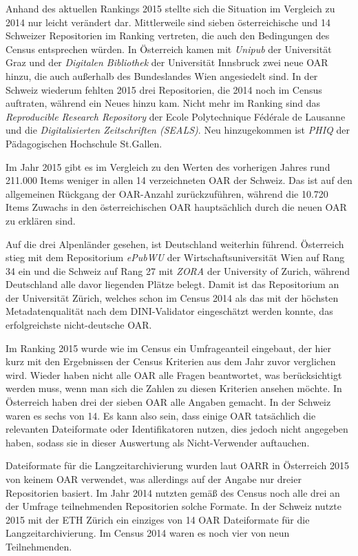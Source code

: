 \documentclass[a4paper,
fontsize=11pt,
oneside,
numbers=noperiodatend,
parskip=half-,
bibliography=totoc,
final
]{scrartcl}
\begin{document}
Anhand des aktuellen Rankings 2015 stellte sich die Situation im
Vergleich zu 2014 nur leicht verändert dar. Mittlerweile sind sieben
österreichische und 14 Schweizer Repositorien im Ranking vertreten, die
auch den Bedingungen des Census entsprechen würden. In Österreich kamen
mit \emph{Unipub} der Universität Graz und der \emph{Digitalen
Bibliothek} der Universität Innsbruck zwei neue OAR hinzu, die auch
außerhalb des Bundeslandes Wien angesiedelt sind. In der Schweiz
wiederum fehlten 2015 drei Repositorien, die 2014 noch im Census
auftraten, während ein Neues hinzu kam. Nicht mehr im Ranking sind das
\emph{Reproducible Research Repository} der Ecole Polytechnique Fédérale
de Lausanne und die \emph{Digitalisierten Zeitschriften (SEALS)}. Neu
hinzugekommen ist \emph{PHIQ} der Pädagogischen Hochschule St.Gallen.

Im Jahr 2015 gibt es im Vergleich zu den Werten des vorherigen Jahres
rund 211.000 Items weniger in allen 14 verzeichneten OAR der Schweiz.
Das ist auf den allgemeinen Rückgang der OAR-Anzahl zurückzuführen,
während die 10.720 Items Zuwachs in den österreichischen OAR
hauptsächlich durch die neuen OAR zu erklären sind.

Auf die drei Alpenländer gesehen, ist Deutschland weiterhin führend.
Österreich stieg mit dem Repositorium \emph{ePubWU} der
Wirtschaftsuniversität Wien auf Rang 34 ein und die Schweiz auf Rang 27
mit \emph{ZORA} der University of Zurich, während Deutschland alle davor
liegenden Plätze belegt. Damit ist das Repositorium an der Universität
Zürich, welches schon im Census 2014 als das mit der höchsten
Metadatenqualität nach dem DINI-Validator eingeschätzt werden konnte,
das erfolgreichste nicht-deutsche OAR.

Im Ranking 2015 wurde wie im Census ein Umfrageanteil eingebaut, der
hier kurz mit den Ergebnissen der Census Kriterien aus dem Jahr zuvor
verglichen wird. Wieder haben nicht alle OAR alle Fragen beantwortet,
was berücksichtigt werden muss, wenn man sich die Zahlen zu diesen
Kriterien ansehen möchte. In Österreich haben drei der sieben OAR alle
Angaben gemacht. In der Schweiz waren es sechs von 14. Es kann also
sein, dass einige OAR tatsächlich die relevanten Dateiformate oder
Identifikatoren nutzen, dies jedoch nicht angegeben haben, sodass sie in
dieser Auswertung als Nicht-Verwender auftauchen.

Dateiformate für die Langzeitarchivierung wurden laut OARR in Österreich
2015 von keinem OAR verwendet, was allerdings auf der Angabe nur dreier
Repositorien basiert. Im Jahr 2014 nutzten gemäß des Census noch alle
drei an der Umfrage teilnehmenden Repositorien solche Formate. In der
Schweiz nutzte 2015 mit der ETH Zürich ein einziges von 14 OAR
Dateiformate für die Langzeitarchivierung. Im Census 2014 waren es noch
vier von neun Teilnehmenden.
\end{document}
